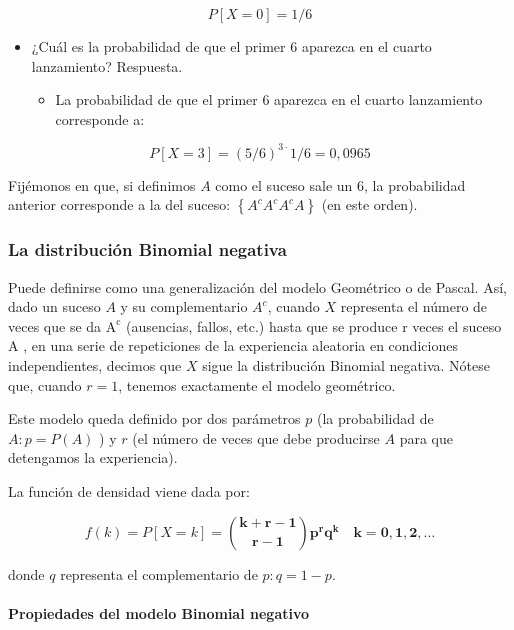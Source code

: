\documentclass[
]{article}
\providecommand{\tightlist}{%
  \setlength{\itemsep}{0pt}\setlength{\parskip}{0pt}}
\begin{document}
\[
P[X=0]=1 / 6
\]

\begin{itemize}
\item
  ¿Cuál es la probabilidad de que el primer 6 aparezca en el cuarto lanzamiento? Respuesta.

  \begin{itemize}
  \tightlist
  \item
    La probabilidad de que el primer 6 aparezca en el cuarto lanzamiento corresponde a:
  \end{itemize}
\end{itemize}

\[
P[X=3]=(5 / 6)^{3 \cdot} 1 / 6=0,0965
\]

Fijémonos en que, si definimos \(A\) como el suceso sale un 6, la probabilidad anterior corresponde a la del suceso: \(\left\{A^{c} A^{c} A^{c} A\right\}\) (en este orden).

\subsubsection{La distribución Binomial negativa}\label{la-distribuciuxf3n-binomial-negativa}

Puede definirse como una generalización del modelo Geométrico o de Pascal. Así, dado un suceso \(A\) y su complementario \(A^{c}\), cuando \(X\) representa el número de veces que se da \(\mathrm{A}^{\mathrm{c}}\) (ausencias, fallos, etc.) hasta que se produce r veces el suceso A , en una serie de repeticiones de la experiencia aleatoria en condiciones independientes, decimos que \(X\) sigue la distribución Binomial negativa. Nótese que, cuando \(r=1\), tenemos exactamente el modelo geométrico.

Este modelo queda definido por dos parámetros \(p\) (la probabilidad de \(A: p=P(A)\) ) y \(r\) (el número de veces que debe producirse \(A\) para que detengamos la experiencia).

La función de densidad viene dada por:

\[
f(k)=P[X=k]=\binom{\mathbf{k}+\mathbf{r}-\mathbf{1}}{\mathbf{r}-\mathbf{1}} \mathbf{p}^{\mathbf{r}} \mathbf{q}^{\mathbf{k}} \quad \mathbf{k}=\mathbf{0}, \mathbf{1}, \mathbf{2}, \ldots
\]

donde \(q\) representa el complementario de \(p: q=1-p\).

\paragraph{Propiedades del modelo Binomial negativo}\label{propiedades-del-modelo-binomial-negativo}
\end{document}
